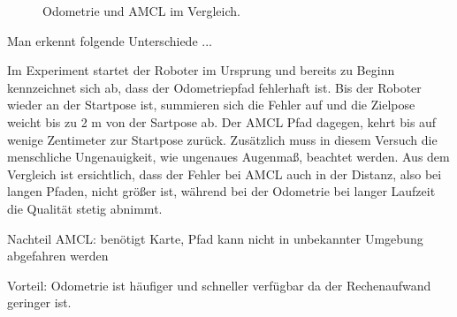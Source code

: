 \documentclass[11pt,a4paper]{article}
\begin{document}
{\begin{figure}[h]
	\centering
	\par\medskip
	\caption{ Odometrie und AMCL im Vergleich. }
\end{figure}




Man erkennt folgende Unterschiede ...

Im Experiment startet der Roboter im Ursprung und bereits zu Beginn kennzeichnet sich ab, dass der Odometriepfad fehlerhaft ist. Bis der Roboter wieder an der Startpose ist, summieren sich die Fehler auf und die Zielpose weicht bis zu 2 m von der Sartpose ab. Der AMCL Pfad dagegen, kehrt bis auf wenige Zentimeter zur Startpose zur\"uck. Zus\"atzlich muss in diesem Versuch die menschliche Ungenauigkeit, wie ungenaues Augenma{\ss}, beachtet werden. Aus dem Vergleich ist ersichtlich, dass der Fehler bei AMCL auch in der Distanz, also bei langen Pfaden, nicht gr\"o{\ss}er ist, w\"ahrend bei der Odometrie bei langer Laufzeit die Qualit\"at stetig abnimmt.


Nachteil AMCL: benötigt Karte, Pfad kann nicht in unbekannter Umgebung abgefahren werden

Vorteil: Odometrie ist h\"aufiger und schneller verf\"ugbar da der Rechenaufwand geringer ist. 


}
\end{document}
